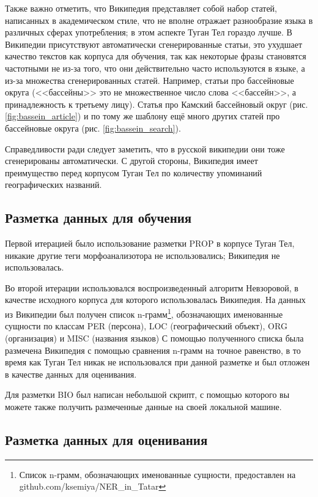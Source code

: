 Также важно отметить, что Википедия представляет собой набор статей, написанных в академическом стиле, что не вполне отражает разнообразие языка в различных сферах употребления; в этом аспекте Туган Тел гораздо лучше. В Википедии присутствуют автоматически сгенерированные статьи, это ухудшает качество текстов как корпуса для обучения, так как некоторые фразы становятся частотными не из-за того, что они действительно часто используются в языке, а из-за множества сгенерированных статей. Например, статьи про бассейновые округа (<<бассейны>> это не множественное число слова <<бассейн>>, а принадлежность к третьему лицу). Статья про Камский бассейновый округ (рис. \ref{fig:bassein_article}) и по тому же шаблону ещё много других статей про бассейновые округа (рис. \ref{fig:bassein_search}). 

Справедливости ради следует заметить, что в русской википедии они тоже сгенерированы автоматически. С другой стороны, Википедия имеет преимущество перед корпусом Туган Тел по количеству упоминаний географических названий.

\subsection{Разметка данных для обучения}

Первой итерацией было использование разметки PROP в корпусе Туган Тел, никакие другие теги морфоанализотора не использовались; Википедия не использовалась. 

Во второй итерации использовался воспроизведенный алгоритм Невзоровой, в качестве исходного корпуса для которого использовалась Википедия. На данных из Википедии был получен список n-грамм\footnote{Список n-грамм, обозначающих именованные сущности, предоставлен на github.com/ksemiya/NER\_in\_Tatar}, обозначающих именованные сущности по классам PER (персона), LOC (географический объект), ORG (организация) и MISC (названия языков) С помощью полученного списка была размечена Википедия с помощью сравнения n-грамм на точное равенство, в то время как Туган Тел никак не использовался при данной разметке и был отложен в качестве данных для оценивания.

Для разметки BIO был написан небольшой скрипт, с помощью которого вы можете также получить размеченные данные на своей локальной машине.


\subsection{Разметка данных для оценивания}

